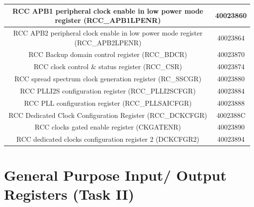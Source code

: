 \documentclass[footheight=20pt, footsepline, headheight=20pt, headsepline]{scrartcl}
\begin{document}
\begin{tabular}{ |c|c| }
    \hline
    RCC APB1 peripheral clock enable in low power mode register (RCC\_APB1LPENR) & 40023860\\
    \hline
    RCC APB2 peripheral clock enable in low power mode register (RCC\_APB2LPENR) & 40023864\\
    \hline
    RCC Backup domain control register (RCC\_BDCR) & 40023870\\
    \hline
    RCC clock control \& status register (RCC\_CSR) & 40023874\\
    \hline
    RCC spread spectrum clock generation register (RC\_SSCGR) & 40023880\\
    \hline
    RCC PLLI2S configuration register (RCC\_PLLI2SCFGR) &  40023884\\
    \hline
    RCC PLL configuration register (RCC\_PLLSAICFGR) & 40023888\\
    \hline
    RCC Dedicated Clock Configuration Register (RCC\_DCKCFGR) & 4002388C\\
    \hline
    RCC clocks gated enable register (CKGATENR) & 40023890\\
    \hline
    RCC dedicated clocks configuration register 2 (DCKCFGR2) & 40023894\\
    \hline
\end{tabular}
\vspace{.5cm}
\section*{General Purpose Input/ Output Registers (Task II)}
\end{document}
